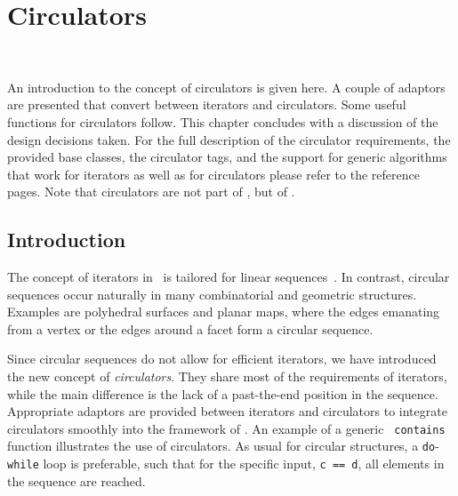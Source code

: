 
\gdef\lciIfHtmlClassLinks{\lcFalse}
\gdef\lciIfHtmlRefLinks{\lcFalse}
\gdef\lciIfHtmlLinks{\lcFalse}

\chapter{Circulators}
\label{chapterCirculators}

\\

An introduction to the concept of circulators is given here. A couple
of adaptors are presented that convert between iterators and
circulators. Some useful functions for circulators follow. This
chapter concludes with a discussion of the design decisions taken. For
the full description of the circulator requirements, the provided base
classes, the circulator tags, and the support for generic algorithms
that work for iterators as well as for circulators please refer to the
reference pages. Note that circulators are not part of \stl, but of \cgal.

\section{Introduction}
\label{sectionIntroduction}
\label{sectionCirculatorWarning}

The concept of iterators in \stl\ is tailored for linear
sequences~\cite{c-isplc-98,ms-strg-96}.  In contrast, circular
sequences occur naturally in many combinatorial and geometric
structures. Examples are polyhedral surfaces and planar maps, where
the edges emanating from a vertex or the edges around a facet form a
circular sequence.

Since circular sequences do not allow for efficient iterators, we have
introduced the new concept of {\em circulators}. They share most of
the requirements of iterators, while the main difference is the lack
of a past-the-end position in the sequence. Appropriate adaptors are
provided between iterators and circulators to integrate circulators
smoothly into the framework of \stl. An example of a generic {\tt
  contains} function illustrates the use of circulators.  As usual for
circular structures, a {\tt do}-{\tt while} loop is preferable, such
that for the specific input, {\tt c == d}, all elements in the
sequence are reached.

